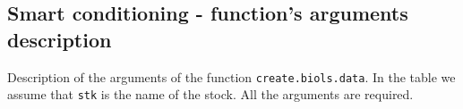 
\begin{landscape}

\section{Smart conditioning - function's arguments description} \label{sec:SmartCond_tab}

\setcounter{figure}{0} 
\setcounter{table}{0}


\begin{table}[!ht]

  \centering
  \begin{footnotesize}
    
    \caption{Description of the arguments of the function \texttt{create.biols.data}. 
      In the table we assume that \texttt{stk} is the name of the stock. All the arguments are required.}
    
    \label{tb:A4.table1}
    
    \begin{threeparttable}
    

\end{threeparttable}
\end{footnotesize}
\end{table}
\end{landscape}
